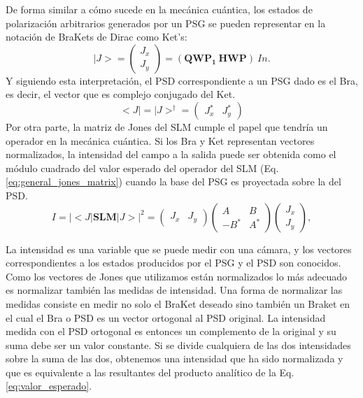 De forma similar a cómo sucede en la mecánica cuántica, los estados de
polarización arbitrarios generados por un PSG se pueden representar en
la notación de BraKets de Dirac como Ket's:
\begin{equation}
|J> = \begin{pmatrix} J_x \\ J_y\end{pmatrix} = \left( \mathbf{QWP_1}\
\mathbf{HWP}\right)\ In.
\end{equation}
Y siguiendo esta interpretación, el PSD correspondiente a un PSG dado
es el Bra, es decir, el vector que es complejo conjugado del Ket.
\begin{equation}
<J|= |J>^{\dagger} = \begin{pmatrix} J_x^* &  J_y^*\end{pmatrix} 
\end{equation}
Por otra parte, la matriz de Jones del SLM cumple el papel que tendría un
operador en la mecánica cuántica. Si los Bra y Ket representan vectores normalizados, la
intensidad del campo a la salida puede ser obtenida como el módulo
cuadrado del valor
esperado del operador del SLM  (Eq. \ref{eq:general_jones_matrix})
cuando la base del PSG es proyectada sobre la del PSD.
\begin{equation}
\label{eq:valor_esperado}
I = |<J|\mathbf{SLM} |J>|^2 = 
\begin{pmatrix}
J_x & J_y
\end{pmatrix}
\begin{pmatrix}
A & B\\
 -B^* & A^* 
\end{pmatrix}
\begin{pmatrix}
J_x \\ J_y
\end{pmatrix}
,
\end{equation}

La intensidad es una variable que se puede medir con una cámara, y los vectores
correspondientes a los estados producidos por el PSG y el PSD son
conocidos. Como los vectores de Jones que utilizamos están
normalizados lo más adecuado es normalizar también las medidas de
intensidad. Una forma de normalizar las medidas consiste en medir no
solo el BraKet deseado sino también un Braket en el cual el Bra o PSD es un
vector ortogonal al PSD original.  La intensidad medida con el PSD
ortogonal es entonces un complemento de la original y su suma debe ser
un valor constante. Si se divide cualquiera de las dos intensidades
sobre la suma de las dos, obtenemos una intensidad que ha sido
normalizada y que es equivalente a las resultantes del producto
analítico de la Eq. \ref{eq:valor_esperado}. 

